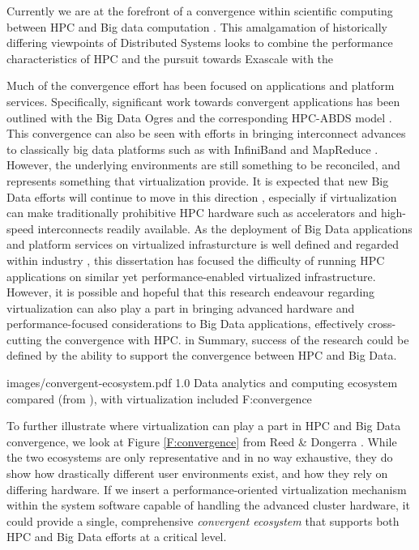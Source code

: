 Currently we are at the forefront of a convergence within scientific computing between HPC and Big data computation \cite{reed2015exascale}. This amalgamation of historically differing viewpoints of Distributed Systems looks to combine the performance characteristics of HPC and the pursuit towards Exascale with the 

Much of the convergence effort has been focused on applications and platform services. Specifically, significant work towards convergent applications has been outlined with the Big Data Ogres \cite{Jha2014apache} and the corresponding HPC-ABDS model \cite{qiu2014towards}.  This convergence can also be seen with efforts in bringing interconnect advances to classically big data platforms such as with InfiniBand and MapReduce \cite{panda2013hadoop}. However, the underlying environments are still something to be reconciled, and represents something that virtualization provide. It is expected that new Big Data efforts will continue to move in this direction \cite{ekanayake2016spidal}, especially if virtualization can make traditionally prohibitive HPC hardware such as accelerators and high-speed interconnects readily available. As the deployment of Big Data applications and platform services on virtualized infrasturcture is well defined and regarded within industry \cite{tian2011towards}, this dissertation has focused the difficulty of running HPC applications on similar yet performance-enabled virtualized infrastructure.  However, it is possible and hopeful that this research endeavour regarding virtualization can also play a part in bringing advanced hardware and performance-focused considerations to Big Data applications, effectively cross-cutting the convergence with HPC. in Summary, success of the research could be defined by the ability to support the convergence between HPC and Big Data.

 {images/convergent-ecosystem.pdf}
 {1.0}
 {Data analytics and computing ecosystem compared (from \cite{reed2015exascale}), with virtualization included}
 {F:convergence}


To further illustrate where virtualization can play a part in HPC and Big Data convergence, we look at Figure \ref{F:convergence} from Reed \& Dongerra \cite{reed2015exascale}. While the two ecosystems are only representative and in no way exhaustive, they do show how drastically different user environments exist, and how they rely on differing hardware. If we insert a performance-oriented virtualization mechanism within the system software capable of handling the advanced cluster hardware, it could provide a single, comprehensive \emph{convergent ecosystem} that supports both HPC and Big Data efforts at a critical level. 


